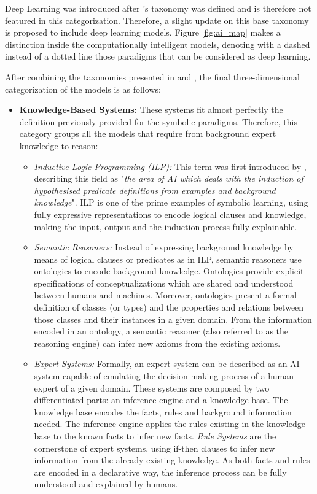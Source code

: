 Deep Learning was introduced after \cite{hopgood_2009_knowledge-based}'s taxonomy was defined and is therefore not featured in this categorization. Therefore, a slight update on this base taxonomy is proposed to include deep learning models. Figure \ref{fig:ai_map} makes a distinction inside the computationally intelligent models, denoting with a dashed instead of a dotted line those paradigms that can be considered as deep learning. 

After combining the taxonomies presented in \cite{hopgood_2009_knowledge-based} and \cite{corea_ai_2019}, the final three-dimensional categorization of the models is as follows:
\begin{itemize}
    \item \textbf{Knowledge-Based Systems:} These systems fit almost perfectly the definition previously provided for the symbolic paradigms. Therefore, this category groups all the models that require from background expert knowledge to reason:
    \begin{itemize}
        \item \textit{Inductive Logic Programming (ILP):} This term was first introduced by \cite{Muggleton1991}, describing this field as "\textit{the area of AI which deals with the induction of hypothesised predicate definitions from examples and background knowledge}". ILP is one of the prime examples of symbolic learning, using fully expressive representations to encode logical clauses and knowledge, making the input, output and the induction process fully explainable.
        \item \textit{Semantic Reasoners:} Instead of expressing background knowledge by means of logical clauses or predicates as in ILP, semantic reasoners use ontologies to encode background knowledge. Ontologies \citep{noy2001ontology} provide explicit specifications of conceptualizations which are shared and understood between humans and machines. Moreover, ontologies present a formal definition of classes (or types) and the properties and relations between those classes and their instances in a given domain. From the information encoded in an ontology, a semantic reasoner (also referred to as the reasoning engine) can infer new axioms from the existing axioms.
        \item \textit{Expert Systems:} Formally, an expert system can be described as an AI system capable of emulating the decision-making process of a human expert of a given domain. These systems are composed by two differentiated parts: an inference engine and a knowledge base. The knowledge base encodes the facts, rules and background information needed. The inference engine applies the rules existing in the knowledge base to the known facts to infer new facts. \textit{Rule Systems} are the cornerstone of expert systems, using if-then clauses to infer new information from the already existing knowledge. As both facts and rules are encoded in a declarative way, the inference process can be fully understood and explained by humans. 
        

\end{itemize}
\end{itemize}

